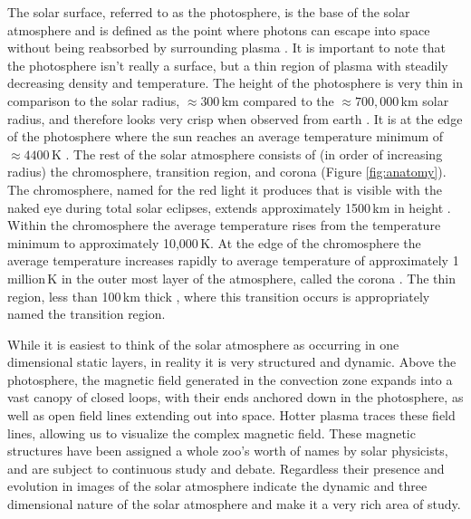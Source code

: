 The solar surface, referred to as the photosphere, is the base of the solar atmosphere and is defined as the point where photons can escape into space without being reabsorbed by surrounding plasma \citep{Priest2014}.
It is important to note that the photosphere isn't really a surface, but a thin region of plasma with steadily decreasing density and temperature.
The height of the photosphere is very thin in comparison to the solar radius, $\approx300$\,km compared to the $\approx700,000$\,km solar radius, and therefore looks very crisp when observed from earth \citep{JudgeBook}.
It is at the edge of the photosphere where the sun reaches an average temperature minimum of $\approx4400$\,K \citep{SolarPhysicsOverview}.
The rest of the solar atmosphere consists of (in order of increasing radius) the chromosphere, transition region, and corona (Figure \ref{fig:anatomy}).
The chromosphere, named for the red light it produces that is visible with the naked eye during total solar eclipses, extends approximately 1500\,km in height \citep{SolarPhysicsOverview}.
Within the chromosphere the average temperature rises from the temperature minimum to approximately 10,000\,K.
At the edge of the chromosphere the average temperature increases rapidly to average temperature of approximately 1 million\,K in the outer most layer of the atmosphere, called the corona \citep{SolarPhysicsOverview}.
The thin region, less than 100\,km thick \citep{Priest2014}, where this transition occurs is appropriately named the transition region.


While it is easiest to think of the solar atmosphere as occurring in one dimensional static layers, in reality it is very structured and dynamic.
Above the photosphere, the magnetic field generated in the convection zone expands into a vast canopy of closed loops, with their ends anchored down in the photosphere, as well as open field lines extending out into space.
Hotter plasma traces these field lines, allowing us to visualize the complex magnetic field.
These magnetic structures have been assigned a whole zoo's worth of names by solar physicists, and are subject to continuous study and debate.
Regardless their presence and evolution in images of the solar atmosphere indicate the dynamic and three dimensional nature of the solar atmosphere and make it a very rich area of study.


